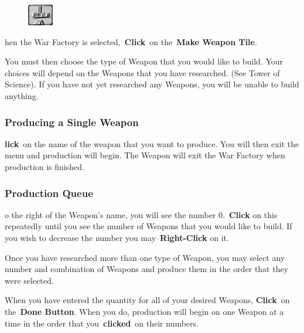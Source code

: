 
\begin{figure}
	\vspace{-20pt}
	\begin{center}
		\includegraphics[width=0.1\textwidth]{Tweaponmake}
	\end{center}
	\vspace{-20pt}
\end{figure}

hen the War Factory is selected, \textbf{Click} on the \textbf{Make Weapon Tile}.

You must then choose the type of Weapon that you would like to build. Your choices will depend on the Weapons that you have researched. (See Tower of Science). If you have not yet researched any Weapons, you will be unable to build anything.

\subsubsection{Producing a Single Weapon}

\textbf{lick} on the name of the weapon that you want to produce. You will then exit the menu and production will begin. The Weapon will exit the War Factory when production is finished.

\subsubsection{Production Queue}

o the right of the Weapon’s name, you will see the number 0. \textbf{Click} on this repeatedly until you see the number of Weapons that you would like to build. If you wish to decrease the number you may \textbf{Right-Click} on it.

Once you have researched more than one type of Weapon, you may select any number and combination of Weapons and produce them in the order that they were selected.

When you have entered the quantity for all of your desired Weapons, \textbf{Click} on the \textbf{Done Button}. When you do, production will begin on one Weapon at a time in the order that you \textbf{clicked} on their numbers.

